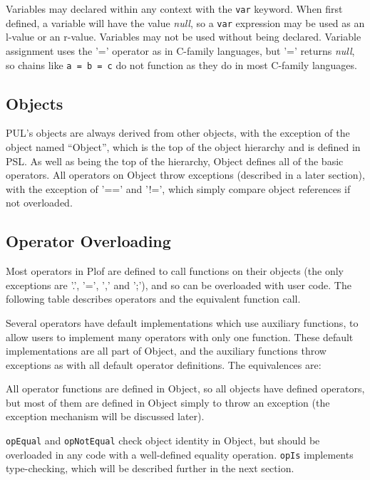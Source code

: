 Variables may declared within any context with the \texttt{var} keyword. When first defined, a variable will have the value \textit{null}, so a \texttt{var} expression may be used as an l-value or an r-value. Variables may not be used without being declared. Variable assignment uses the '=' operator as in C-family languages, but '=' returns \textit{null}, so chains like \texttt{a = b = c} do not function as they do in most C-family languages.



\subsection{Objects}

PUL's objects are always derived from other objects, with the exception of the object named “Object”, which is the top of the object hierarchy and is defined in PSL. As well as being the top of the hierarchy, Object defines all of the basic operators. All operators on Object throw exceptions (described in a later section), with the exception of '==' and '!=', which simply compare object references if not overloaded.



\subsection{Operator Overloading}

Most operators in Plof are defined to call functions on their objects (the only exceptions are '.', '=', ',' and ';'), and so can be overloaded with user code. The following table describes operators and the equivalent function call.


Several operators have default implementations which use auxiliary functions, to allow users to implement many operators with only one function. These default implementations are all part of Object, and the auxiliary functions throw exceptions as with all default operator definitions. The equivalences are:


All operator functions are defined in Object, so all objects have defined operators, but most of them are defined in Object simply to throw an exception (the exception mechanism will be discussed later).

\texttt{opEqual} and \texttt{opNotEqual} check object identity in Object, but should be overloaded in any code with a well-defined equality operation. \texttt{opIs} implements type-checking, which will be described further in the next section.



